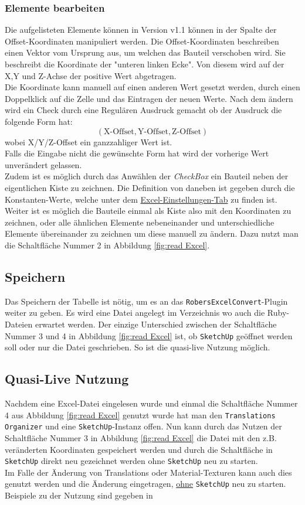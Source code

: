\documentclass{book}
\newcommand{\sketchup}{\texttt{SketchUp}\xspace}
\newcommand{\robersexcelconvert}{\texttt{RobersExcelConvert}\xspace}
\newcommand{\assisttool}{\texttt{Translations Organizer}\xspace}
\begin{document}
			\subsubsection{Elemente bearbeiten} \label{element bearbeiten}
				Die aufgelisteten Elemente können in Version v1.1 können in der Spalte der Offset-Koordinaten manipuliert werden. Die Offset-Koordinaten beschreiben einen Vektor vom Ursprung aus, um welchen das Bauteil verschoben wird. Sie beschreibt die Koordinate der "unteren linken Ecke". Von diesem wird auf der X,Y und Z-Achse der positive Wert abgetragen.\\
				Die Koordinate kann manuell auf einen anderen Wert gesetzt werden, durch einen Doppelklick auf die Zelle und das Eintragen der neuen Werte. Nach dem ändern wird ein Check durch eine Regulären Ausdruck gemacht ob der Ausdruck die folgende Form hat:
					$$ ( \text{X-Offset}, \text{Y-Offset}, \text{Z-Offset})$$
				wobei X/Y/Z-Offset ein ganzzahliger Wert ist.\\
				Falls die Eingabe nicht die gewünschte Form hat wird der vorherige Wert unverändert gelassen.\\
				Zudem ist es möglich durch das Anwählen der \textit{CheckBox} ein Bauteil neben der eigentlichen Kiste zu zeichnen. Die Definition von \glqq daneben \grqq ist gegeben durch die Konstanten-Werte, welche unter dem \hyperref[excel konstanten]{Excel-Einstellungen-Tab} zu finden ist.\\
				Weiter ist es möglich die Bauteile einmal als Kiste also mit den Koordinaten zu zeichnen, oder alle ähnlichen Elemente nebeneinander und unterschiedliche Elemente übereinander zu zeichnen um diese manuell zu ändern. Dazu nutzt man die Schaltfläche Nummer 2 in Abbildung \ref{fig:read Excel}.
			\subsection{Speichern}
				Das Speichern der Tabelle ist nötig, um es an das \robersexcelconvert-Plugin weiter zu geben. Es wird eine Datei angelegt im Verzeichnis wo auch die Ruby-Dateien erwartet werden. Der einzige Unterschied zwischen der Schaltfläche Nummer 3 und 4 in Abbildung \ref{fig:read Excel} ist, ob \sketchup geöffnet werden soll oder nur die Datei geschrieben. So ist die quasi-live Nutzung möglich. 
			\subsection{Quasi-Live Nutzung}
				Nachdem eine Excel-Datei eingelesen wurde und einmal die Schaltfläche Nummer 4 aus Abbildung \ref{fig:read Excel} genutzt wurde hat man den \assisttool und eine \sketchup-Instanz offen. Nun kann durch das Nutzen der Schaltfläche Nummer 3 in Abbildung \ref{fig:read Excel} die Datei mit den z.B. veränderten Koordinaten gespeichert werden und durch die Schaltfläche in \sketchup direkt neu gezeichnet werden ohne \sketchup neu zu starten.\\
				Im Falle der Änderung von Translations oder Material-Texturen kann auch dies genutzt werden und die Änderung eingetragen, \underline{ohne} \sketchup neu zu starten. Beispiele zu der Nutzung sind gegeben in %
\end{document}

